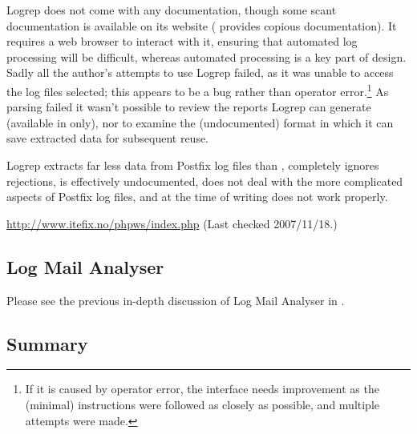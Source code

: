 Logrep does not come with any documentation, though some scant
documentation is available on its website (\parsername{} provides copious
documentation).  It requires a web browser to interact with it, ensuring
that automated log processing will be difficult, whereas automated
processing is a key part of \parsernames{} design.  Sadly all the author's
attempts to use Logrep failed, as it was unable to access the log files
selected; this appears to be a bug rather than operator error.\footnote{If
it is caused by operator error, the interface needs improvement as the
(minimal) instructions were followed as closely as possible, and multiple
attempts were made.}  As parsing failed it wasn't possible to review the
reports Logrep can generate (available in \HTML{} only), nor to examine the
(undocumented) format in which it can save extracted data for subsequent
reuse.

Logrep extracts far less data from Postfix log files than \parsername{},
completely ignores rejections, is effectively undocumented, does not deal
with the more complicated aspects of Postfix log files, and at the time of
writing does not work properly.

\url{http://www.itefix.no/phpws/index.php} \newline (Last checked
2007/11/18.)

\subsection{Log Mail Analyser}

Please see the previous in-depth discussion of Log Mail Analyser in
.


\subsection{Summary}

